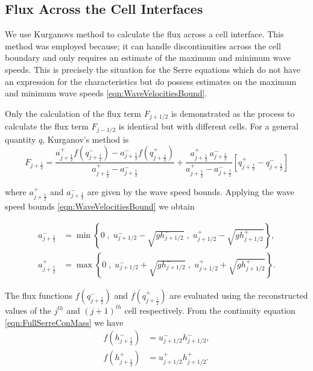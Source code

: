 \subsection{Flux Across the Cell Interfaces}

We use Kurganovs method \cite{Kurganov-etal-2001-707} to calculate the flux across a cell interface. This method was employed because; it can handle discontinuities across the cell boundary and only requires an estimate of the maximum and minimum wave speeds. This is precisely the situation for the Serre equations which do not have an expression for the characteristics but do possess estimates on the maximum and minimum wave speeds \eqref{eqn:WaveVelocitiesBound}.

Only the calculation of the flux term $F_{j+1/2}$ is demonstrated as the process to calculate the flux term $F_{j-1/2}$ is identical but with different cells. For a general quantity $q$, Kurganov's method \cite{Kurganov-etal-2001-707} is
\begin{equation}\label{eqn:HLL_flux}
F_{j+\frac{1}{2}} = \dfrac{a^+_{j+\frac{1}{2}} f\left(q^-_{j+\frac{1}{2}}\right) - a^-_{j+\frac{1}{2}} f\left(q^+_{j+\frac{1}{2}}\right)}{a^+_{j+\frac{1}{2}} - a^-_{j+\frac{1}{2}}}  + \dfrac{a^+_{j+\frac{1}{2}} \, a^-_{j+\frac{1}{2}}}{a^+_{j+\frac{1}{2}} - a^-_{j+\frac{1}{2}}} \left [ q^+_{j+\frac{1}{2}} - q^-_{j+\frac{1}{2}} \right ]
\end{equation}

where $a^+_{j+\frac{1}{2}}$ and $a^-_{j+\frac{1}{2}}$ are given by the wave speed bounds. Applying the wave speed bounds \eqref{eqn:WaveVelocitiesBound} we obtain

\begin{align}
a^-_{j+\frac{1}{2}} &= \min\left\lbrace 0\;,\;  u^-_{j + 1/2} - \sqrt{g h^-_{j + 1/2}}  \;,\;u^+_{j + 1/2} - \sqrt{g h^+_{j + 1/2}} \right\rbrace  ,\\
a^+_{j+\frac{1}{2}} &= \max\left\lbrace 0 \;,\;  u^-_{j + 1/2} + \sqrt{g h^-_{j + 1/2}}  \;,\;u^+_{j + 1/2} + \sqrt{g h^+_{j + 1/2}} \right\rbrace .
\label{eqn:WaveSpeedBoundsFluxApprox}
\end{align}

The flux functions $f(q^-_{j+\frac{1}{2}})$ and $f(q^+_{j+\frac{1}{2}})$ are evaluated using the reconstructed values of the $j^{th}$ and $(j+1)^{th}$ cell respectively. From the continuity equation \eqref{eqn:FullSerreConMass} we have
\begin{align*}
f\left(h^-_{j+\frac{1}{2}}\right) &= u^-_{j + 1/2}  h^-_{j + 1/2}   ,\\
f\left(h^+_{j+\frac{1}{2}}\right) &= u^+_{j + 1/2}  h^+_{j + 1/2}  .
\end{align*}

